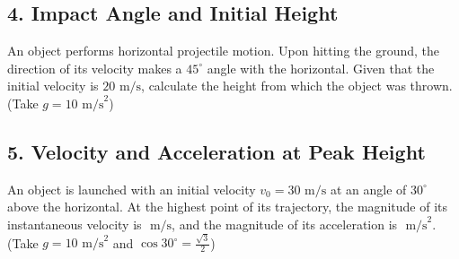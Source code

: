 \documentclass[12pt]{article}
\begin{document}
\newpage
\subsection*{4. Impact Angle and Initial Height}
An object performs horizontal projectile motion. Upon hitting the ground, the direction of its velocity makes a $45^\circ$ angle with the horizontal. Given that the initial velocity is $20 \text{ m/s}$, calculate the height from which the object was thrown. (Take $g = 10 \text{ m/s}^2$)

\vspace{15cm}

\subsection*{5. Velocity and Acceleration at Peak Height}
An object is launched with an initial velocity $v_0 = 30 \text{ m/s}$ at an angle of $30^\circ$ above the horizontal. At the highest point of its trajectory, the magnitude of its instantaneous velocity is \underline{\hspace{2cm}} $\text{ m/s}$, and the magnitude of its acceleration is \underline{\hspace{2cm}} $\text{ m/s}^2$. (Take $g = 10 \text{ m/s}^2$ and $\cos 30^\circ = \frac{\sqrt{3}}{2}$)
\end{document}
